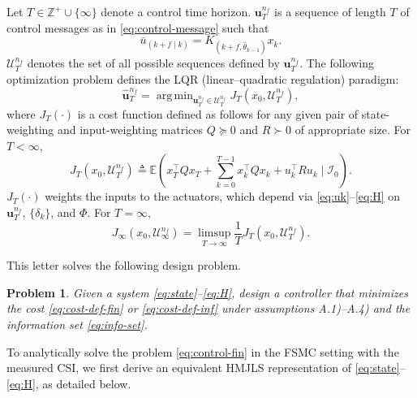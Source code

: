 \documentclass[journal,twoside,web]{ieeecolor}
\newtheorem{problem}{Problem}
\begin{document}
Let $T\in\mathbb{Z}^{+} \cup \{\infty\}$ denote a control time horizon. $\bm{u}_{T}^{n_f}$ is a sequence of length $T$ of control messages as in \eqref{eq:control-message} such that
\begin{equation}\label{eq:control-element}
    \bar{u}_{(k+f\mid k)} = K_{(k+f,\hat{\theta}_{k-1})}x_k.
\end{equation}
$\mathcal{U}_{T}^{n_f}$ denotes the set of all possible sequences defined by $\bm{u}_{T}^{n_f}$.
The following optimization problem defines
the LQR (linear--quadratic regulation) paradigm:
\begin{equation}\label{eq:control-fin}
    \hat{\bm{u}}_{T}^{n_f} = \mathop{\mathrm{arg\,min}}_{\bm{u}_{T}^{n_f} \in \mathcal{U}_{T}^{n_f}} J_{T}^{}(x_0,\mathcal{U}_{T}^{n_f}),
\end{equation}
where $J_{T}^{}(\cdot)$ is a cost function defined as follows for any given pair of state-weighting and input-weighting matrices $Q\succeq 0$ and $R \succ 0$ of appropriate size.
For $T<\infty$,
\begin{equation}\label{eq:cost-def-fin}
    J_{T}^{}(x_0,\mathcal{U}_{T}^{n_f}) \!\triangleq \mathbb{E}(x_T^{\top} Q x_T +\! \sum_{k=0}^{T-1} x_k^{\top} Q x_k + u_k^{\top}Ru_k \mid \mathcal{I}_0).
\end{equation}
$J_{T}^{}(\cdot)$ weights the inputs to the actuators, which depend via \eqref{eq:uk}--\eqref{eq:H} on $\bm{u}_{T}^{n_f}$, $\{\delta_k\}$, and $\mathit{\Phi}$. For $T=\infty$, 
\begin{equation}\label{eq:cost-def-inf}
    J_{\infty}^{}(x_0,\mathcal{U}_{\infty}^{n_f}) = \limsup_{T\to\infty} \frac{1}{T} J_{T}^{}(x_0,\mathcal{U}_{T}^{n_f}).
\end{equation}

This letter solves the following design problem.

\begin{problem}\label{problem:lqr}
   Given a system \eqref{eq:state}--\eqref{eq:H}, design a controller that minimizes the cost \eqref{eq:cost-def-fin} or \eqref{eq:cost-def-inf} under assumptions A.1)--A.4) and the information set \eqref{eq:info-set}.
\end{problem}

To analytically solve the problem \eqref{eq:control-fin} in the FSMC setting with the measured CSI, we first derive an equivalent HMJLS representation of \eqref{eq:state}--\eqref{eq:H}, as detailed below. 
\end{document}

